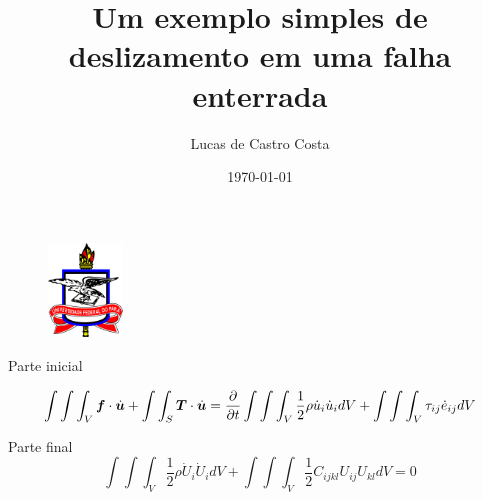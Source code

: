 \documentclass{beamer}
\title[Demonstração]{Um exemplo simples de deslizamento em uma falha enterrada} %
\author{Lucas de Castro Costa} %
\institute[UFPA] %
{
	Professor: Jessé Costa\\
Universidade Federal do Pará \\ %
\medskip
}
\date{\today} %
\begin{document}
 \begin{frame}
\begin{figure}[htb]
\centering
\includegraphics[width= 2cm, height= 2.5cm]{logo.jpg}
\end{figure}

\titlepage
\end{frame}

\begin{frame}{Parte inicial}


$$\int \int \int_{V} \boldsymbol{f}\cdot \dot{\boldsymbol{u}}  + \int \int_{S} \boldsymbol{T} \cdot \dot{\boldsymbol{u}} = 
 \frac{\partial }{\partial t} \int \int \int_{V} \frac{1}{2} \rho \dot{u}_i \dot{u}_i dV + 
 \int \int \int_{V} \tau_{ij} \dot{e}_{ij}dV$$
	


\end{frame}

\begin{frame}{Parte final}
 $$\int \int \int_{V} \frac{1}{2} \rho \dot{U}_i \dot{U}_i dV + \int \int \int_{V} \frac{1}{2} C_{ijkl}U_{ij}U_{kl}dV = 0   $$
 
\end{frame}
\end{document}
